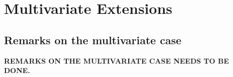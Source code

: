 \chapter{Multivariate Extensions}
\section{Remarks on the multivariate case}

\noindent\textbf{REMARKS ON THE MULTIVARIATE CASE NEEDS TO BE DONE.}


